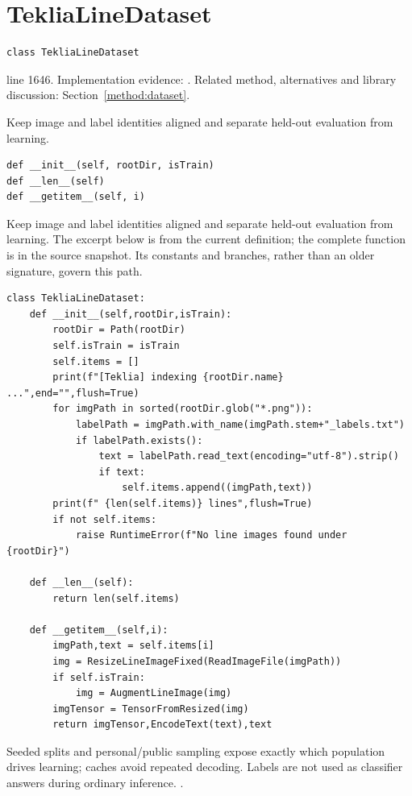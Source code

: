 \section{TekliaLineDataset}\label{fn:train:TekliaLineDataset}
\begin{lstlisting}[style=sig]
class TekliaLineDataset
\end{lstlisting}
 line 1646. Implementation evidence: \cite{code2026}. Related method, alternatives and library discussion: Section~\ref{method:dataset}.


Keep image and label identities aligned and separate held-out evaluation from learning.


\begin{lstlisting}[style=plain]
def __init__(self, rootDir, isTrain)
def __len__(self)
def __getitem__(self, i)
\end{lstlisting}
Keep image and label identities aligned and separate held-out evaluation from learning. The excerpt below is from the current definition; the complete function is in the source snapshot. Its constants and branches, rather than an older signature, govern this path.


\begin{lstlisting}[style=plain]
class TekliaLineDataset:
    def __init__(self,rootDir,isTrain):
        rootDir = Path(rootDir)
        self.isTrain = isTrain
        self.items = []
        print(f"[Teklia] indexing {rootDir.name} ...",end="",flush=True)
        for imgPath in sorted(rootDir.glob("*.png")):
            labelPath = imgPath.with_name(imgPath.stem+"_labels.txt")
            if labelPath.exists():
                text = labelPath.read_text(encoding="utf-8").strip()
                if text:
                    self.items.append((imgPath,text))
        print(f" {len(self.items)} lines",flush=True)
        if not self.items:
            raise RuntimeError(f"No line images found under {rootDir}")

    def __len__(self):
        return len(self.items)

    def __getitem__(self,i):
        imgPath,text = self.items[i]
        img = ResizeLineImageFixed(ReadImageFile(imgPath))
        if self.isTrain:
            img = AugmentLineImage(img)
        imgTensor = TensorFromResized(img)
        return imgTensor,EncodeText(text),text
\end{lstlisting}
Seeded splits and personal/public sampling expose exactly which population drives learning; caches avoid repeated decoding. Labels are not used as classifier answers during ordinary inference. \cite{marti2002,code2026,torchdata}.


